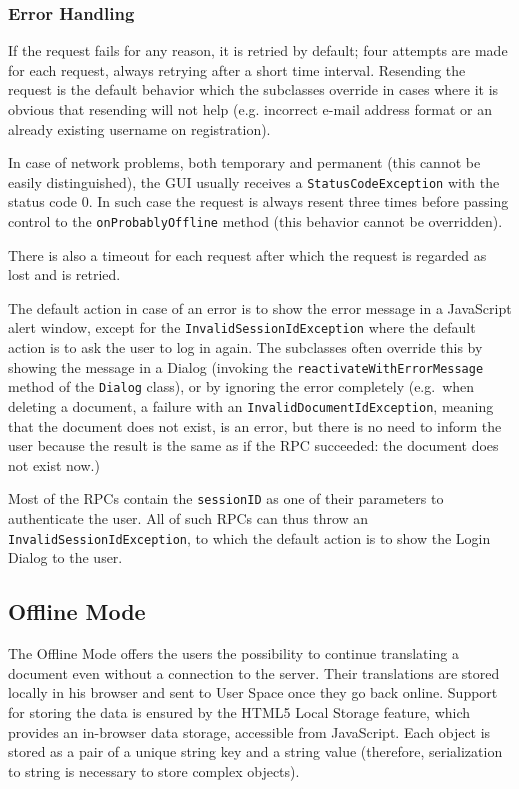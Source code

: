 \subsubsection{Error Handling}

If the request fails for any reason, it is retried by default; four attempts are made for each request, always retrying after a short time interval.
Resending the request is the default behavior which the subclasses override in cases where it is obvious that resending will not help (e.g. incorrect e-mail address format or an already existing username on registration).

In case of network problems, both temporary and permanent (this cannot be easily distinguished), the GUI usually receives a {\tt StatusCodeException} with the status code 0. In such case the request is always resent three times before passing control to the {\tt onProbablyOffline} method (this behavior cannot be overridden).

There is also a timeout for each request after which the request is regarded as lost and is retried.

The default action in case of an error is to show the error message in a JavaScript alert window, except for the {\tt InvalidSessionIdException} where the default action is to ask the user to log in again.
The subclasses often override this by showing the message in a Dialog (invoking the {\tt reactivateWithErrorMessage} method of the {\tt Dialog} class), or by ignoring the error completely (e.g.\ when deleting a document, a failure with an {\tt InvalidDocumentIdException}, meaning that the document does not exist, is an error, but there is no need to inform the user because the result is the same as if the RPC succeeded: the document does not exist now.)

Most of the RPCs contain the {\tt sessionID} as one of their parameters to authenticate the user. All of such RPCs can thus throw an {\tt InvalidSessionIdException}, to which the default action is to show the Login Dialog to the user.

\subsection{Offline Mode}

The Offline Mode offers the users the possibility to continue translating a document even without a connection to the server. Their translations are stored locally in his browser and sent to User Space once they go back online.
Support for storing the data is ensured by the HTML5 Local Storage feature, which provides an in-browser data storage, accessible from JavaScript.
Each object is stored as a pair of a unique string key and a string value (therefore, serialization to string is necessary to store complex objects).

